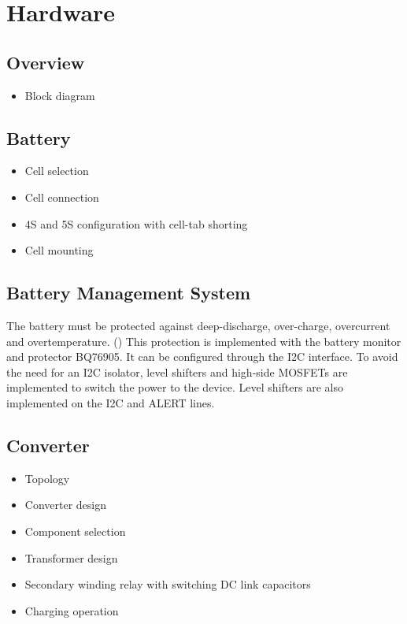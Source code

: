 \section{Hardware}

\FloatBarrier

\subsection{Overview}
\label{sec_hw_overview}
\begin{itemize}
    \item Block diagram
\end{itemize}

\FloatBarrier

\subsection{Battery}
\label{sec_battery}
\begin{itemize}
    \item Cell selection
    \item Cell connection
    \item 4S and 5S configuration with cell-tab shorting
    \item Cell mounting
\end{itemize}

\subsection{Battery Management System}
\label{sec_bms}
The battery must be protected against deep-discharge, over-charge, overcurrent and overtemperature. ()
This protection is implemented with the battery monitor and protector BQ76905. It can be configured through the \ac{I2C} interface. To avoid the need for an \ac{I2C} isolator, level shifters and high-side \acp{MOSFET} are implemented to switch the power to the device. Level shifters are also implemented on the \ac{I2C} and ALERT lines. 

\FloatBarrier

\subsection{Converter}
\label{sec_converter}
\begin{itemize}
    \item Topology
    \item Converter design
    \item Component selection
    \item Transformer design
    \item Secondary winding relay with switching DC link capacitors
    \item Charging operation
\end{itemize}

